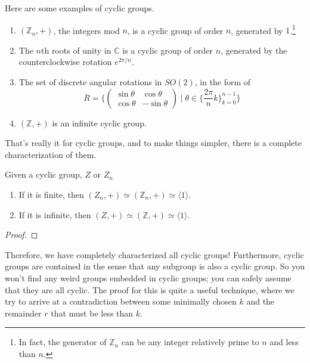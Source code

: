   \begin{example} 
    Here are some examples of cyclic groups. 
    \begin{enumerate}
      \item $(\mathbb{Z}_n, +)$, the integers mod $n$, is a cyclic group of order $n$, generated by $1$.\footnote{In fact, the generator of $\mathbb{Z}_n$ can be any integer relatively prime to $n$ and less than $n$.} 
      \item The $n$th roots of unity in $\mathbb{C}$ is a cyclic group of order $n$, generated by the counterclockwise rotation $e^{2\pi/n}$. 
      \item The set of discrete angular rotations in $SO(2)$, in the form of 
      \begin{equation}
        R =  \bigg\{ \begin{pmatrix}
        \sin{\theta} & \cos{\theta} \\
        \cos{\theta} & -\sin{\theta}
        \end{pmatrix}\; \bigg| \; \theta \in \Big\{\frac{2 \pi}{n} k\Big\}_{k = 0}^{n-1} \bigg\}
      \end{equation}

      \item $(\mathbb{Z}, +)$ is an infinite cyclic group. 
    \end{enumerate}
  \end{example}

  That's really it for cyclic groups, and to make things simpler, there is a complete characterization of them. 

  \begin{theorem}
    Given a cyclic group, $Z$ or $Z_n$ 
    \begin{enumerate}
      \item If it is finite, then $(Z_n, +) \simeq (\mathbb{Z}_n, +) \simeq \langle 1 \rangle$. 
      \item If it is infinite, then $(Z, +) \simeq (\mathbb{Z}, +) \simeq \langle 1 \rangle$. 
    \end{enumerate}
  \end{theorem}
  \begin{proof}
    
  \end{proof} 

  Therefore, we have completely characterized all cyclic groups! Furthermore, cyclic groups are contained in the sense that any subgroup is also a cyclic group. So you won't find any weird groups embedded in cyclic groups; you can safely assume that they are all cyclic. The proof for this is quite a useful technique, where we try to arrive at a contradiction between some minimally chosen $k$ and the remainder $r$ that must be less than $k$. 


